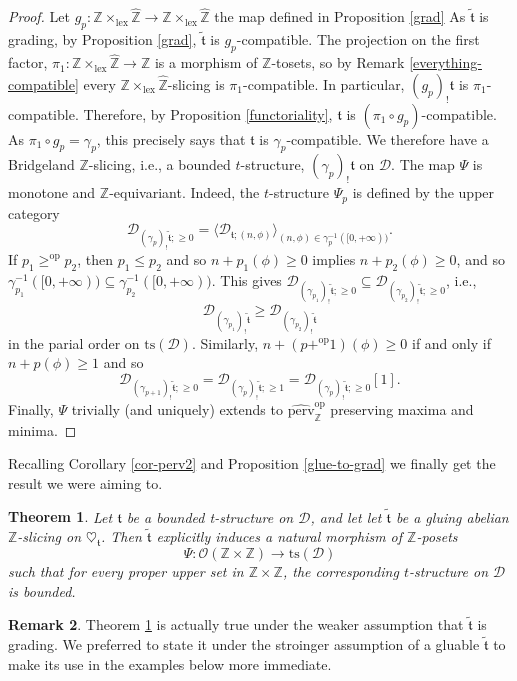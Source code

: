 \documentclass{article}
\newtheorem{thm}{Theorem}[section]
\theoremstyle{definition}
\newtheorem{rem}[thm]{Remark}
\newcommand{\Z}{\mathbb{Z}}
\newcommand{\Oo}{\mathcal{O}}
\newcommand{\ts}{\mathrm{ts}}
\newcommand{\tee}{\mathfrak{t}}
\begin{document}
\begin{proof}
Let $g_p\colon \mathbb{Z} \times_{\mathrm{lex}} \hat{\mathbb{Z}}\to \mathbb{Z} \times_{\mathrm{lex}} \hat{\mathbb{Z}}$ the map defined in Proposition \ref{grad}
As $\tilde{\tee}$ is grading, by Proposition \ref{grad}, $\tilde{\tee}$ is $g_p$-compatible. The projection on the first factor, $\pi_1\colon  \mathbb{Z} \times_{\mathrm{lex}} \hat{\mathbb{Z}}\to \Z$ is a morphism of $\Z$-tosets, so by Remark \ref{everything-compatible} every $\mathbb{Z} \times_{\mathrm{lex}} \hat{\mathbb{Z}}$-slicing is $\pi_1$-compatible. In particular, $(g_p)_!\tee$ is $\pi_1$-compatible. Therefore, by Proposition \ref{functoriality}, $\tee$ is $(\pi_1\circ g_p)$-compatible. As $\pi_1\circ g_p=\gamma_p$, this precisely says that $\tee$ is $\gamma_p$-compatible. We therefore have a Bridgeland $\Z$-slicing, i.e., a bounded $t$-structure, $(\gamma_p)_!\tee$ on $\mathscr{D}$. The map $\Psi$ is monotone and $\Z$-equivariant. Indeed, the $t$-structure $\Psi_p$ is defined by the upper category
\[
\mathscr{D}_{(\gamma_{p})_!\tilde{\tee};\geq 0}=\langle \mathscr{D}_{\tee;(n,\phi)}\rangle_{(n,\phi)\in \gamma_p^{-1}([0,+\infty))}.
\]
If $p_1\geq^{\mathrm{op}} p_2$, then  $p_1\leq p_2$ and so $n+p_1(\phi)\geq 0$ implies $n+p_2(\phi)\geq 0$, and so $\gamma_{p_1}^{-1}([0,+\infty))\subseteq \gamma_{p_2}^{-1}([0,+\infty))$. This gives $\mathscr{D}_{(\gamma_{p_1})_!\tilde{\tee};\geq 0}\subseteq \mathscr{D}_{(\gamma_{p_2})_!\tilde{\tee};\geq 0}$, i.e.,
\[
\mathscr{D}_{(\gamma_{p_1})_!\tilde{\tee}}\geq \mathscr{D}_{(\gamma_{p_2})_!\tilde{\tee}}
\]
in the parial order on  $\ts(\mathscr{D})$. Similarly, $n+(p+^{\mathrm{op}}1)(\phi)\geq 0$ if and only if $n+p(\phi)\geq 1$ and so
\[
\mathscr{D}_{(\gamma_{p+1})_!\tilde{\tee};\geq 0}=\mathscr{D}_{(\gamma_{p})_!\tilde{\tee};\geq 1}=\mathscr{D}_{(\gamma_{p})_!\tilde{\tee};\geq 0}[1].
\]
Finally, $\Psi$ trivially (and uniquely) extends to $\widehat{\mathrm{perv}}_\Z^{\mathrm{op}}$ preserving maxima and minima.
\end{proof}
Recalling Corollary \ref{cor-perv2} and Proposition \ref{glue-to-grad} we finally get the result we were aiming to.
\begin{thm}\label{main-thm}
Let $\mathfrak{t}$ be a bounded t-structure on $\mathscr{D}$, and let let $\tilde{\tee}$ be a gluing abelian $\mathbb{Z}$-slicing on $\heartsuit_{\mathfrak{t}}$. Then $\tilde{\tee}$ explicitly induces a natural morphism of $\Z$-posets
\[
\Psi\colon\Oo(\Z\times\Z)\to \ts(\mathscr{D})
\]
such that for every proper upper set in $\Z\times \Z$, the corresponding $t$-structure on $\mathscr{D}$ is bounded. 
\end{thm}
\begin{rem}
Theorem \ref{main-thm} is actually true under the weaker assumption that $\tilde{\tee}$ is grading. We preferred to state it under the stroinger assumption of a gluable $\tilde{\tee}$ to make its use in the examples below more immediate.
\end{rem}
\end{document}
